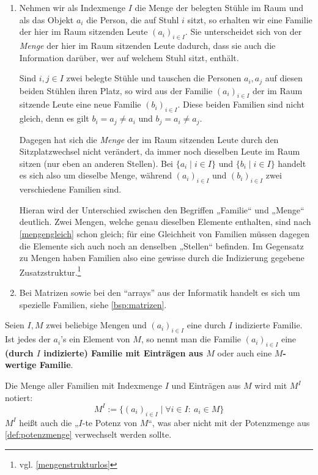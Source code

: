 \begin{bsp} \quad
    \begin{enumerate}
	\item Nehmen wir als Indexmenge $I$ die Menge der belegten Stühle im Raum und als das Objekt $a_i$ die Person, die auf Stuhl $i$ sitzt, so erhalten wir eine Familie der hier im Raum sitzenden Leute $(a_i)_{i\in I}$. Sie unterscheidet sich von der \textit{Menge} der hier im Raum sitzenden Leute dadurch, dass sie auch die Information darüber, wer auf welchem Stuhl sitzt, enthält.
	
	Sind $i,j\in I$ zwei belegte Stühle und tauschen die Personen $a_i,a_j$ auf diesen beiden Stühlen ihren Platz, so wird aus der Familie $(a_i)_{i\in I}$ der im Raum sitzende Leute eine neue Familie $(b_i)_{i\in I}$. Diese beiden Familien sind nicht gleich, denn es gilt $b_i=a_j\neq a_i$ und $b_j=a_i\neq a_j$.
	
	Dagegen hat sich die \emph{Menge} der im Raum sitzenden Leute durch den Sitzplatzwechsel nicht verändert, da immer noch dieselben Leute im Raum sitzen (nur eben an anderen Stellen). Bei $\{a_i\mid i\in I\}$ und $\{b_i \mid i\in I\}$ handelt es sich also um dieselbe Menge, während $(a_i)_{i\in I}$ und $(b_i)_{i\in I}$ zwei verschiedene Familien sind.
	
    Hieran wird der Unterschied zwischen den Begriffen „Familie“ und „Menge“ deutlich. Zwei Mengen, welche genau dieselben Elemente enthalten, sind nach \cref{mengengleich} schon gleich; für eine Gleichheit von Familien müssen dagegen die Elemente sich auch noch an denselben „Stellen“ befinden. Im Gegensatz zu Mengen haben Familien also eine gewisse durch die Indizierung gegebene Zusatzstruktur.\footnote{vgl. \cref{mengenstrukturlos}}
	\item Bei Matrizen sowie bei den ``arrays'' aus der Informatik handelt es sich um spezielle Familien, siehe \cref{bsp:matrizen}.
    \end{enumerate}
\end{bsp}


\begin{de} \label{def:mengenpotenz}
    Seien $I,M$ zwei beliebige Mengen und $(a_i)_{i\in I}$ eine durch $I$ indizierte Familie. Ist jedes der $a_i$'s ein Element von $M$, so nennt man die Familie $(a_i)_{i\in I}$ eine \textbf{(durch $I$ indizierte) Familie mit Einträgen aus $M$} oder auch eine \textbf{$M$-wertige Familie}.
    
    Die Menge aller Familien mit Indexmenge $I$ und Einträgen aus $M$ wird mit $M^I$ notiert:
        \[ M^I := \{ (a_i)_{i\in I} \mid \forall i\in I:\ a_i \in M \} \]
    $M^I$ heißt auch die „$I$-te Potenz von $M$“, was aber nicht mit der Potenzmenge aus \cref{def:potenzmenge} verwechselt werden sollte.
\end{de}


